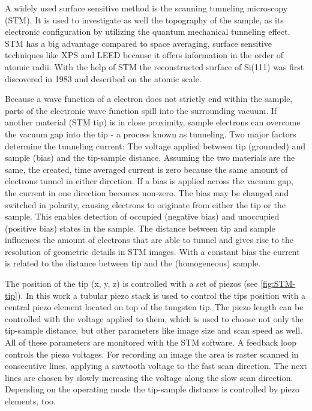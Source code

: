 A widely used surface sensitive method is the scanning tunneling microscopy (STM).  It is used to investigate as well the topography of the sample, as its electronic configuration by utilizing the quantum mechanical tunneling effect. STM has a big advantage compared to space averaging, surface sensitive techniques like XPS and LEED because it offers information in the order of atomic radii. With the help of STM the reconstructed surface of Si(111) was first discovered \cite{binnig_1983} in 1983 and described on the atomic scale.

Because a wave function of a electron does not strictly end within the sample, parts of the electronic wave function spill into the surrounding vacuum. If another material (STM tip) is in close proximity, sample electrons can overcome the vacuum gap into the tip - a process known as tunneling. Two major factors determine the tunneling current: The voltage applied between tip (grounded) and sample (bias) and the tip-sample distance. Assuming the two materials are the same, the created, time averaged current is zero because the same amount of electrons tunnel in either direction. If a bias is applied across the vacuum gap, the current in one direction becomes non-zero. The bias may be changed and switched in polarity, causing electrons to originate from either the tip or the sample. This enables detection of occupied (negative bias) and unoccupied (positive bias) states in the sample. The distance between tip and sample influences the amount of electrons that are able to tunnel and gives rise to the resolution of geometric details in STM images. With a constant bias the current is related to the distance between tip and the (homogeneous) sample.

The position of the tip (x, y, z) is controlled with a set of piezos (see \autoref{fig:STM-tip}). In this work a tubular piezo stack is used to control the tips position with a central piezo element located on top of the tungsten tip. The piezo length can be controlled with the voltage applied to them, which is used to choose not only the tip-sample distance, but other parameters like image size and scan speed as well. All of these parameters are monitored with the STM software. A feedback loop controls the piezo voltages. For recording an image the area is raster scanned in consecutive lines, applying a sawtooth voltage to the fast scan direction. The next lines are chosen by slowly increasing the voltage along the slow scan direction. Depending on the operating mode the tip-sample distance is controlled by piezo elements, too.

